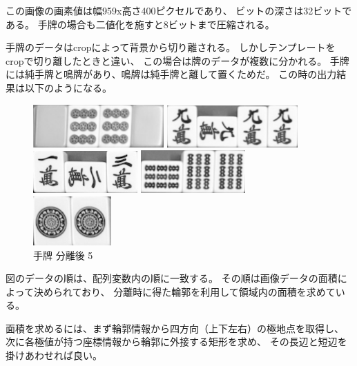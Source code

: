 \documentclass{jsarticle}
\begin{document}
\begin{multicols}{2}
この画像の画素値は幅959x高さ400ピクセルであり、
ビットの深さは32ビットである。
手牌の場合も二値化を施すと8ビットまで圧縮される。

手牌のデータはcropによって背景から切り離される。
しかしテンプレートをcropで切り離したときと違い、
この場合は牌のデータが複数に分かれる。
手牌には純手牌と鳴牌があり、鳴牌は純手牌と離して置くためだ。
この時の出力結果は以下のようになる。

\begin{figure}[H]
  \begin{center}
    \includegraphics[clip,width=5.0cm]{./img/hand0_0.png}
    \caption{手牌 分離後 1}
    \label{fig:hand0}
    \includegraphics[clip,width=5.0cm]{./img/hand1_0.png}
    \caption{手牌 分離後 2}
    \label{fig:hand1}
    \includegraphics[clip,width=4.0cm]{./img/hand2_0.png}
    \caption{手牌 分離後 3}
    \label{fig:hand2}
    \includegraphics[clip,width=4.0cm]{./img/hand3_0.png}
    \caption{手牌 分離後 4}
    \label{fig:hand3}
    \includegraphics[clip,width=3.0cm]{./img/hand4_0.png}
    \caption{手牌 分離後 5}
    \label{fig:hand4}
  \end{center}
\end{figure}

図のデータの順は、配列変数内の順に一致する。
その順は画像データの面積によって決められており、
分離時に得た輪郭を利用して領域内の面積を求めている。

面積を求めるには、まず輪郭情報から四方向（上下左右）の極地点を取得し、
次に各極値が持つ座標情報から輪郭に外接する矩形を求め、
その長辺と短辺を掛けあわせれば良い。


\end{multicols}
\end{document}
